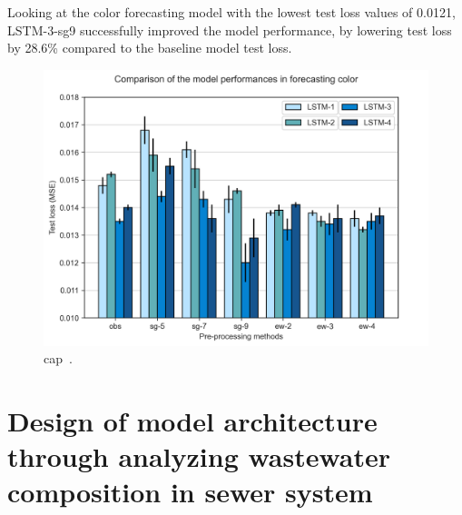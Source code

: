 Looking at the color forecasting model with the lowest test loss values of 0.0121, LSTM-3-sg9 successfully improved the model performance, by lowering test loss by 28.6\% compared to the baseline model test loss.

\begin{figure}[t]
    \centering
    \includegraphics[width=0.7\columnwidth]{imgs/results/feature-engineering/colour-input-1-4-comparison.png}
    \caption{cap~.}
    \label{fig:colour-feature-engineering}
 \end{figure}

\section{Design of model architecture through analyzing wastewater composition in sewer system}
